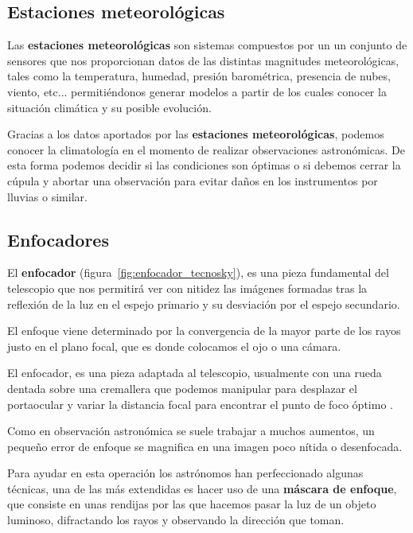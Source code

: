 \begin{itemize}
\begin{itemize}
\subsection{Estaciones meteorológicas} \label{estacion_meteorologica}

Las \textbf{estaciones meteorológicas} son sistemas compuestos por un  un conjunto de sensores que nos proporcionan datos de las distintas magnitudes meteorológicas, tales como la temperatura, humedad, presión barométrica, presencia de nubes, viento, etc... permitiéndonos generar modelos a partir de los cuales conocer la situación climática y su posible evolución. 


Gracias a los datos aportados por las \textbf{estaciones meteorológicas}, podemos conocer la climatología en el momento de realizar observaciones astronómicas. De esta forma podemos decidir si las condiciones son óptimas o si debemos cerrar la cúpula y abortar una observación para evitar daños en los instrumentos por lluvias o similar. 


\subsection{Enfocadores} \label{enfocadores}

El \textbf{enfocador} (figura~\ref{fig:enfocador_tecnosky}), es una pieza fundamental del telescopio que nos permitirá ver con nitidez las imágenes formadas tras la reflexión de la luz en el espejo primario y su desviación por el espejo secundario.


El enfoque viene determinado por la convergencia de la mayor parte de los rayos justo en el plano focal, que es donde colocamos el ojo o una cámara. 


El enfocador, es una pieza adaptada al telescopio, usualmente con una rueda dentada sobre una cremallera que podemos manipular para desplazar el portaocular y variar la distancia focal para encontrar el punto de foco óptimo \cite{enfocador}.


Como en observación astronómica se suele trabajar a muchos aumentos, un pequeño error de enfoque se magnifica en una imagen poco nítida o desenfocada.


Para ayudar en esta operación los astrónomos han perfeccionado algunas técnicas, una de las más extendidas es hacer uso de una \textbf{máscara de enfoque}, \cite{FocusMascara} que consiste en unas rendijas por las que hacemos pasar la luz de un objeto luminoso, difractando los rayos y observando la dirección que toman.



\end{itemize}
\end{itemize}
